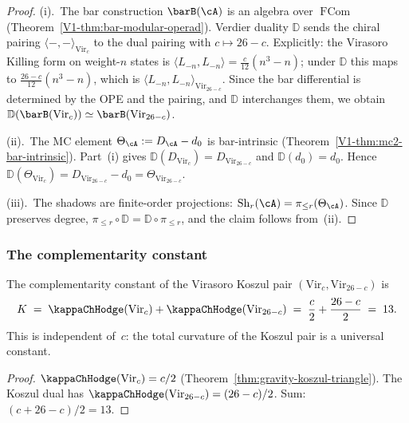 \begin{proof}
(i).\ The bar construction $\barB(\cA)$ is an algebra over
$\operatorname{FCom}$ (Theorem~\ref{V1-thm:bar-modular-operad}).
Verdier duality $\mathbb{D}$ sends the chiral pairing
$\langle -, - \rangle_{\mathrm{Vir}_c}$ to the dual pairing
with $c \mapsto 26 - c$. Explicitly: the Virasoro Killing form
on weight-$n$ states is
$\langle L_{-n}, L_{-n} \rangle = \frac{c}{12}(n^3 - n)$;
under $\mathbb{D}$ this maps to
$\frac{26-c}{12}(n^3 - n)$, which is
$\langle L_{-n}, L_{-n} \rangle_{\mathrm{Vir}_{26-c}}$.
Since the bar differential is determined by the OPE and the
pairing, and $\mathbb{D}$ interchanges them, we obtain
$\mathbb{D}(\barB(\mathrm{Vir}_c))
\simeq \barB(\mathrm{Vir}_{26-c})$.

(ii).\ The MC element $\Theta_\cA := D_\cA - d_0$ is
bar-intrinsic (Theorem~\ref*{V1-thm:mc2-bar-intrinsic}). Part~(i)
gives $\mathbb{D}(D_{\mathrm{Vir}_c})
= D_{\mathrm{Vir}_{26-c}}$ and
$\mathbb{D}(d_0) = d_0$. Hence
$\mathbb{D}(\Theta_{\mathrm{Vir}_c})
= D_{\mathrm{Vir}_{26-c}} - d_0
= \Theta_{\mathrm{Vir}_{26-c}}$.

(iii).\ The shadows are finite-order projections:
$\operatorname{Sh}_r(\cA)
= \pi_{\le r}(\Theta_\cA)$. Since $\mathbb{D}$ preserves
degree, $\pi_{\le r} \circ \mathbb{D}
= \mathbb{D} \circ \pi_{\le r}$, and the claim follows from~(ii).
\end{proof}

\subsubsection*{The complementarity constant}

\begin{proposition}[Complementarity at $K = 13$;
\ClaimStatusProvedHere]
\label{prop:gravity-complementarity-constant}
The complementarity constant of the Virasoro Koszul pair
$(\mathrm{Vir}_c, \mathrm{Vir}_{26-c})$ is
\begin{equation}\label{eq:gravity-complementarity-K}
K
\;=\;
\kappaChHodge(\mathrm{Vir}_c) + \kappaChHodge(\mathrm{Vir}_{26-c})
\;=\;
\frac{c}{2} + \frac{26-c}{2}
\;=\; 13.
\end{equation}
This is independent of~$c$: the total curvature of the Koszul
pair is a universal constant.
\end{proposition}

\begin{proof}
$\kappaChHodge(\mathrm{Vir}_c) = c/2$
(Theorem~\ref{thm:gravity-koszul-triangle}).
The Koszul dual has $\kappaChHodge(\mathrm{Vir}_{26-c}) = (26-c)/2$.
Sum: $(c + 26 - c)/2 = 13$.
\end{proof}

